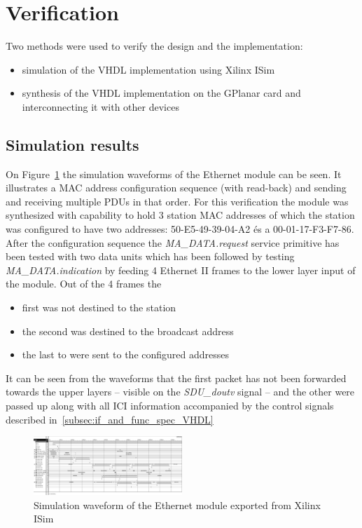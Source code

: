 \documentclass[conference]{IEEEtran}
\begin{document}
\section{Verification}\label{sec:Verification}

Two methods were used to verify the design and the implementation:
\begin{itemize}
\renewcommand \labelitemi{--}
\item simulation of the VHDL implementation using Xilinx ISim
\item synthesis of the VHDL implementation on the GPlanar card and interconnecting it with other devices
\end{itemize}

\subsection{Simulation results}

On Figure~\ref{fig:eth_sim} the simulation waveforms of the Ethernet module can be seen. It illustrates a MAC address configuration sequence (with read-back) and sending and receiving multiple PDUs in that order. For this verification the module was synthesized with capability to hold 3 station MAC addresses of which the station was configured to have two addresses: 50-E5-49-39-04-A2 és a 00-01-17-F3-F7-86. After the configuration sequence the \emph{MA\_DATA.request} service primitive has been tested with two data units which has been followed by testing \emph{MA\_DATA.indication} by feeding 4 Ethernet II frames to the lower layer input of the module. Out of the 4 frames the 
\begin{itemize}
\renewcommand \labelitemi{--}
\item first was not destined to the station
\item the second was destined to the broadcast address
\item the last to were sent to the configured addresses
\end{itemize}
It can be seen from the waveforms that the first packet has not been forwarded towards the upper layers -- visible on the \emph{SDU\_doutv} signal -- and the other were passed up along with all ICI information accompanied by the control signals described in~\ref{subsec:if_and_func_spec_VHDL}

\begin{figure}[!htb]
    \centering
    \includegraphics[width=0.5\textwidth]{figures_raw/ether_tst_wave.png}
    \caption{Simulation waveform of the Ethernet module exported from Xilinx ISim}
    \label{fig:eth_sim}
\end{figure}
\end{document}

